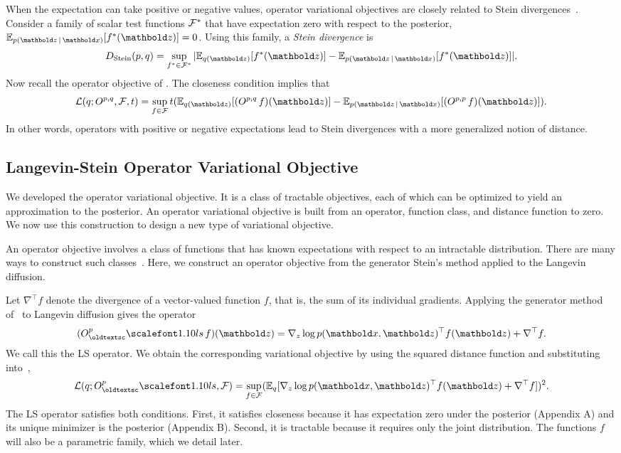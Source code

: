 When the expectation can take positive or negative values, operator
variational objectives are closely related to Stein
divergences~\citep{Barbour:1988}. Consider a family of scalar test
functions $\mathcal{F}^*$ that have expectation zero with respect to the
posterior, $\E_{p(\mbz \g \mbx)}[f^*(\mbz)] = 0$.  Using this family,
a \textit{Stein divergence} is
\begin{align*}
  D_{\textrm{Stein}}(p, q) =
  \sup_{f^* \in \cF^*} |\E_{q(\mbz)}[f^*(\mbz)] - \E_{p(\mbz\g \mbx)}[f^*(\mbz)]|.
\end{align*}
Now recall the operator objective of .  The
closeness condition implies that
\begin{align*}
  \cL(q ; O^{p,q}, \cF, t) = \sup_{f \in \cF}
  t(\E_{q(\mbz)}[(O^{p,q} \, f)(\mbz)] - \E_{p(\mbz \g \mbx)}[(O^{p,p} \, f)(\mbz)]).
\end{align*}
In other words, operators with positive or negative expectations lead
to Stein divergences with a more generalized notion of distance.

\subsection{Langevin-Stein Operator Variational Objective}

We developed the operator variational objective.  It is a class of
tractable objectives, each of which can be optimized to yield an
approximation to the posterior.  An operator variational objective is
built from an operator, function class, and distance function to zero.
We now use this construction to design a new type of variational
objective.

An operator objective involves a class of functions that has known
expectations with respect to an intractable distribution.  There are
many ways to construct such classes~\citep{Assaraf:1999,
  Barbour:1988}.  Here, we construct an operator objective from the
generator Stein's method applied to the Langevin diffusion.


Let $\nabla^\top f$ denote the divergence of a vector-valued
function $f$, that is, the sum of its individual gradients.
Applying the generator method of~\citet{Barbour:1988} to Langevin diffusion
gives the operator
\begin{align}
  (O^{p}_\textsc{ls} \, f)(\mbz) =  \nabla_z \log p(\mbx, \mbz)^\top f(\mbz) + \nabla^\top f.
  \label{eq:lang-stein}
\end{align}
We call this the \gls{LS} operator.  We obtain the corresponding
variational objective by using the squared distance function and
substituting  into~,
\begin{align}
  \label{eq:lang-stein-objective}
  \cL(q ; O^{p}_\textsc{ls}, \cF) = \sup_{f \in \mathcal{F}}
  (\E_q[\nabla_z \log p(\mbx,
  \mbz)^\top f(\mbz) + \nabla^\top f])^2.
\end{align}
The \gls{LS} operator satisfies both conditions.  First, it satisfies
closeness because it has expectation zero under the posterior
(Appendix A) and its unique minimizer is the posterior (Appendix B).
Second, it is tractable because it requires only the joint
distribution. The functions $f$ will also be a parametric family, which we
detail later.

